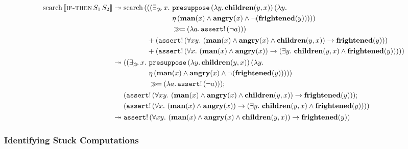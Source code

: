 \begin{align*}
  \operatorname{search}\,\llbracket \textsc{if-then}\,S_1\,S_2 \rrbracket
  &\twoheadrightarrow \operatorname{search}\,(\begin{aligned}[t]
     &((\mathop{\exists_\gg} x.\ \begin{aligned}[t]
         &\mathtt{presuppose}\,(\lambda y.\, \textbf{children}(y, x))\,(\lambda y.\,  \\
         &\eta\,(\textbf{man}(x) \land \textbf{angry}(x) \land \lnot (\textbf{frightened}(y))))) \\
         &\mathbin{\gg\!=} (\lambda a.\, \mathtt{assert}!\,(\lnot a))) \\
       \end{aligned} \\
     &+ (\mathtt{assert}!\,(\forall x y.\ (\textbf{man}(x) \land \textbf{angry}(x) \land
                          \textbf{children}(y, x)) \to \textbf{frightened}(y))) \\
     &+ (\mathtt{assert}!\,(\forall x.\ (\textbf{man}(x) \land \textbf{angry}(x)) \to (\exists y.\ \textbf{children}(y, x) \land \textbf{frightened}(y)))))
   \end{aligned} \\
  &\twoheadrightarrow \begin{aligned}[t]
     &((\mathop{\exists_\gg} x.\ \begin{aligned}[t]
         &\mathtt{presuppose}\,(\lambda y.\, \textbf{children}(y, x))\,(\lambda y.\,  \\
         &\eta\,(\textbf{man}(x) \land \textbf{angry}(x) \land \lnot (\textbf{frightened}(y))))) \\
         &\mathbin{\gg\!=} (\lambda a.\, \mathtt{assert}!\,(\lnot a))); \\
       \end{aligned} \\
     &(\mathtt{assert}!\,(\forall x y.\ (\textbf{man}(x) \land \textbf{angry}(x) \land
                        \textbf{children}(y, x)) \to \textbf{frightened}(y))); \\
     &(\mathtt{assert}!\,(\forall x.\ (\textbf{man}(x) \land \textbf{angry}(x)) \to (\exists y.\ \textbf{children}(y, x) \land \textbf{frightened}(y))))
   \end{aligned} \\
  &\twoheadrightarrow \mathtt{assert}!\,(\forall x y.\ (\textbf{man}(x) \land \textbf{angry}(x) \land
                           \textbf{children}(y, x)) \to \textbf{frightened}(y))
\end{align*}


\subsubsection{Identifying Stuck Computations}

